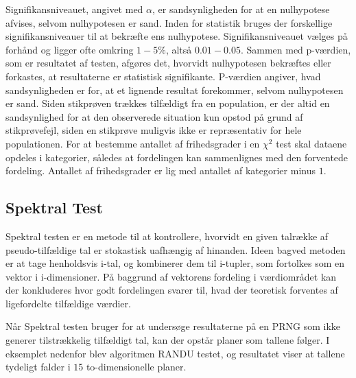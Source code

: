 \noindent Signifikansniveauet, angivet med $\alpha$, er sandsynligheden for at en nulhypotese afvises, selvom nulhypotesen er sand. Inden for statistik bruges der forskellige signifikansniveauer til at bekræfte ens nulhypotese. Signifikansniveauet vælges på forhånd og ligger ofte omkring $1-5\%$, altså $0.01-0.05$. Sammen med p-værdien, som er resultatet af testen, afgøres det, hvorvidt nulhypotesen bekræftes eller forkastes, at resultaterne er statistisk signifikante. P-værdien angiver, hvad sandsynligheden er for, at et lignende resultat forekommer, selvom nulhypotesen er sand. Siden stikprøven trækkes tilfældigt fra en population, er der altid en sandsynlighed for at den observerede situation kun opstod på grund af stikprøvefejl, siden en stikprøve muligvis ikke er repræsentativ for hele populationen. 
For at bestemme antallet af frihedsgrader i en $\chi^2$ test skal dataene opdeles i kategorier, således at fordelingen kan sammenlignes med den forventede fordeling. Antallet af frihedsgrader er lig med antallet af kategorier minus $1$.

\subsection{Spektral Test} 
Spektral testen er en metode til at kontrollere, hvorvidt en given talrække af pseudo-tilfældige tal er stokastisk uafhængig af hinanden. Ideen bagved metoden er at tage henholdsvis i-tal, og kombinerer dem til i-tupler, som fortolkes som en vektor i i-dimensioner. På baggrund af vektorens fordeling i værdiområdet kan der konkluderes hvor godt fordelingen svarer til, hvad der teoretisk forventes af ligefordelte tilfældige værdier.

\noindent Når Spektral testen bruger for at undersøge resultaterne på en PRNG som ikke generer tilstrækkelig tilfældigt tal, kan der opstår planer som tallene følger. I eksemplet nedenfor blev algoritmen RANDU testet, og resultatet viser at tallene tydeligt falder i $15$ to-dimensionelle planer. 


